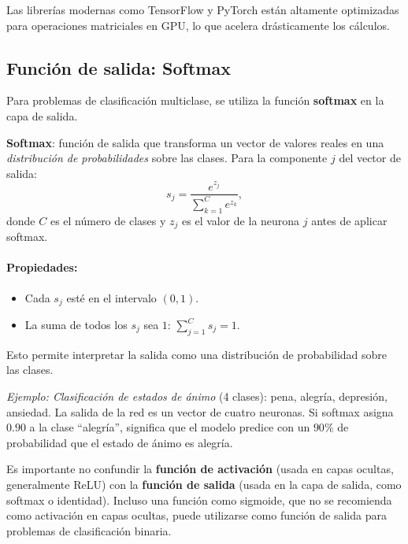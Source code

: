 Las librerías modernas como TensorFlow y PyTorch están altamente optimizadas para operaciones matriciales en GPU, lo que acelera drásticamente los cálculos.

\subsection{Función de salida: Softmax}

Para problemas de clasificación multiclase, se utiliza la función \textbf{softmax} en la capa de salida.

\begin{definicion}
\textbf{Softmax}: función de salida que transforma un vector de valores reales en una \emph{distribución de probabilidades} sobre las clases. Para la componente $j$ del vector de salida:
\begin{equation}
\label{eq:softmax}
s_j = \frac{e^{z_j}}{\sum_{k=1}^{C} e^{z_k}},
\end{equation}
donde $C$ es el número de clases y $z_j$ es el valor de la neurona $j$ antes de aplicar softmax.
\end{definicion}

\paragraph{Propiedades:}
\begin{itemize}
  \item Cada $s_j$ esté en el intervalo $(0, 1)$.
  \item La suma de todos los $s_j$ sea $1$: $\sum_{j=1}^{C} s_j = 1$.
\end{itemize}
Esto permite interpretar la salida como una distribución de probabilidad sobre las clases.

\emph{Ejemplo: Clasificación de estados de ánimo} (4 clases): pena, alegría, depresión, ansiedad. La salida de la red es un vector de cuatro neuronas. Si softmax asigna $0.90$ a la clase ``alegría'', significa que el modelo predice con un $90\%$ de probabilidad que el estado de ánimo es alegría.

\begin{advertencia}
Es importante no confundir la \textbf{función de activación} (usada en capas ocultas, generalmente ReLU) con la \textbf{función de salida} (usada en la capa de salida, como softmax o identidad). Incluso una función como sigmoide, que no se recomienda como activación en capas ocultas, puede utilizarse como función de salida para problemas de clasificación binaria.
\end{advertencia}

